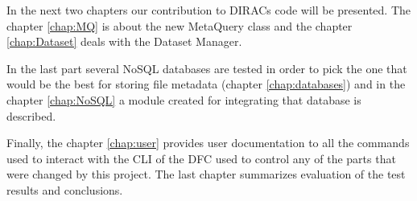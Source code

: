 In the next two chapters our contribution to DIRACs code will be presented. The chapter \ref{chap:MQ} 
is about the new MetaQuery class and the chapter \ref{chap:Dataset} deals with the Dataset Manager.

In the last part several NoSQL databases are tested in order to pick the one that would be the best for storing
file metadata (chapter \ref{chap:databases}) and in the chapter \ref{chap:NoSQL} a module created for integrating that 
database is described. 

Finally, the chapter \ref{chap:user} provides user documentation to all the commands used to interact with the CLI 
of the DFC used to control any of the parts that were changed by this project. The last chapter
summarizes evaluation of the test results and conclusions.